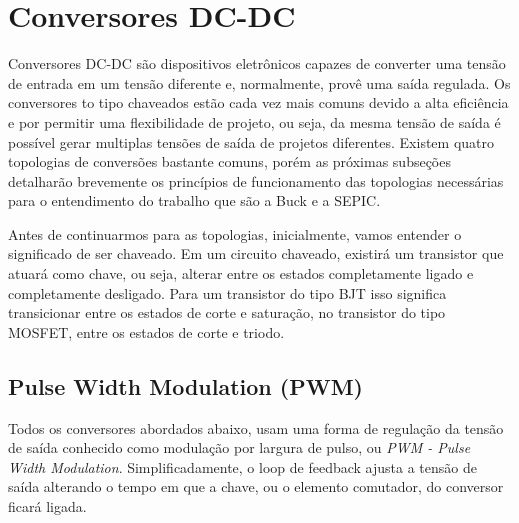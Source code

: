 \section{Conversores DC-DC}\label{converters_revision}
Conversores DC-DC \cite{ti_whitepaper}\cite{power_electronics_hart} são dispositivos eletrônicos capazes de converter uma tensão de entrada em um tensão diferente e, normalmente, provê uma saída regulada. Os conversores to tipo chaveados estão cada vez mais comuns devido a alta eficiência e por permitir uma flexibilidade de projeto, ou seja, da mesma tensão de saída é possível gerar multiplas tensões de saída de projetos diferentes. Existem quatro topologias de conversões bastante comuns, porém as próximas subseções detalharão brevemente os princípios de funcionamento das topologias necessárias para o entendimento do trabalho que são a Buck e a SEPIC.

Antes de continuarmos para as topologias, inicialmente, vamos entender o significado de ser chaveado. Em um circuito chaveado, existirá um transistor que atuará como chave, ou seja, alterar entre os estados completamente ligado e completamente desligado. Para um transistor do tipo BJT isso significa transicionar entre os estados de corte e saturação, no transistor do tipo MOSFET, entre os estados de corte e triodo. 

\subsection*{Pulse Width Modulation (PWM)}
Todos os conversores abordados abaixo, usam uma forma de regulação da tensão de saída conhecido como modulação por largura de pulso, ou \textit{PWM - Pulse Width Modulation}. Simplificadamente, o loop de feedback ajusta a tensão de saída alterando o tempo em que a chave, ou o elemento comutador, do conversor ficará ligada.

\noindent
\begin{minipage}{\linewidth}
\label{PWM_sample_fig}
\end{minipage}

